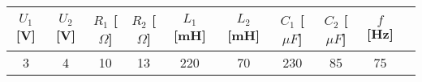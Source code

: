 \documentclass{article}
\begin{document}
\begin{tabular}{| c | c | c | c | c | c | c | c | c | c |}
  \hline
   $U_{1}$[V] & $U_{2}$ [V] & $R_{1}$ [$\Omega$]& $R_{2}$ [$\Omega$]& $L_{1}$ [mH]& $L_{2}$ [mH]& $C_{1}$ [$\mu F$]& $C_{2}$ [$\mu F$]& $f$ [Hz]\\
  \hline
  3 & 4 & 10 & 13 & 220 & 70 & 230 & 85 & 75\\ 
  \hline
\end{tabular}\\
\end{document}
